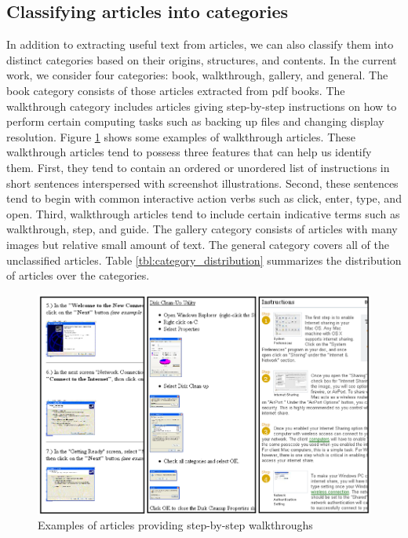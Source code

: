 \documentclass{www2010-submission}
\begin{document}
\subsection{Classifying articles into categories}
\label{sec:classifying_categories}

In addition to extracting useful text from articles, we can also
classify them into distinct categories based on their origins,
structures, and contents.  In the current work, we consider four
categories: book, walkthrough, gallery, and general. The book category
consists of those articles extracted from pdf books. The walkthrough
category includes articles giving step-by-step instructions on how to
perform certain computing tasks such as backing up files and changing
display resolution. Figure \ref{fig:example_walkthrough} shows some
examples of walkthrough articles. These walkthrough articles tend to
possess three features that can help us identify them. First, they
tend to contain an ordered or unordered list of instructions in short
sentences interspersed with screenshot illustrations.  Second, these
sentences tend to begin with common interactive action verbs such as
click, enter, type, and open. Third, walkthrough articles tend to
include certain indicative terms such as walkthrough,
step, and guide. The gallery category consists of articles with many
images but relative small amount of text. The general category covers
all of the unclassified articles. Table \ref{tbl:category_distribution}
summarizes the distribution of articles over the categories.

\begin{figure}
\includegraphics[width=1\columnwidth]{figure/walkthrough_examples.png}
\caption{Examples of articles providing step-by-step walkthroughs}
\label{fig:example_walkthrough}
\end{figure}
\end{document}
